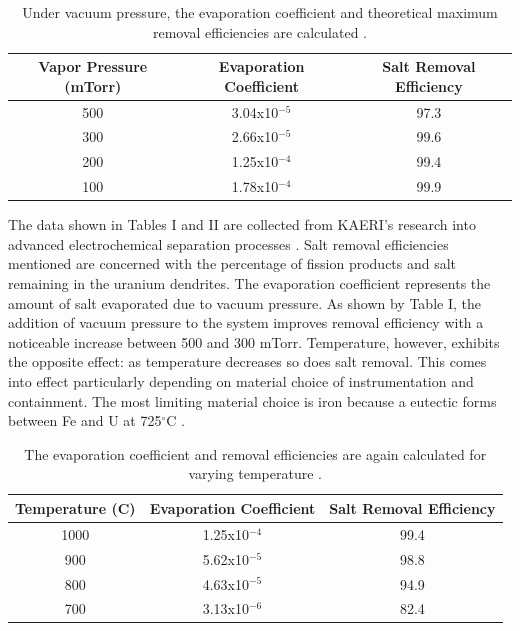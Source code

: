 \documentclass{anstrans}
\begin{document}
\begin{table}[h]
	\centering
	\begin{tabularx}{0.5\textwidth}{ccc}
		\hline
		\textbf{Vapor Pressure (mTorr)} & \textbf{Evaporation Coefficient} & \textbf{Salt Removal Efficiency} \\
		\hline
		500 & 3.04x10$^{-5}$ & 97.3 \\
		300 & 2.66x10$^{-5}$ & 99.6 \\
		200 & 1.25x10$^{-4}$ & 99.4 \\
		100 & 1.78x10$^{-4}$ & 99.9 \\
		\hline
	\end{tabularx}
	\caption {Under vacuum pressure, the evaporation coefficient and theoretical maximum removal efficiencies are calculated \cite{lee_advanced_nodate}.}
	\label {tab:pressure}
\end{table}

The data shown in Tables I and II are collected from \gls{KAERI}'s research into advanced electrochemical separation processes
\cite{lee_advanced_nodate}. Salt removal efficiencies mentioned are concerned with the percentage of fission products 
and salt remaining in the uranium dendrites. The evaporation coefficient represents the amount of salt evaporated due 
to vacuum pressure. As shown by Table I, the addition of vacuum pressure to the system improves removal efficiency 
with a noticeable increase between 500 and 300 mTorr. Temperature, however, exhibits the opposite effect: as temperature 
decreases so does salt removal. This comes into effect particularly depending on material choice of instrumentation and 
containment. The most limiting material choice is iron because a eutectic forms between Fe and U at 725$^{\circ}$C \cite{chapman_revision_1984}.

\begin{table}[h]
	\centering
	\begin{tabularx}{0.5\textwidth}{ccc}
		\hline
		\textbf{Temperature (C)} & \textbf{Evaporation Coefficient} & \textbf{Salt Removal Efficiency} \\
		\hline
		1000 & 1.25x10$^{-4}$ & 99.4 \\
		900 & 5.62x10$^{-5}$ & 98.8 \\
		800 & 4.63x10$^{-5}$ & 94.9 \\
		700 & 3.13x10$^{-6}$ & 82.4 \\
		\hline
	\end{tabularx}
	\caption {The evaporation coefficient and removal efficiencies are again calculated for varying temperature \cite{lee_advanced_nodate}.}
	\label {tab:temperature}
\end{table}
\end{document}
